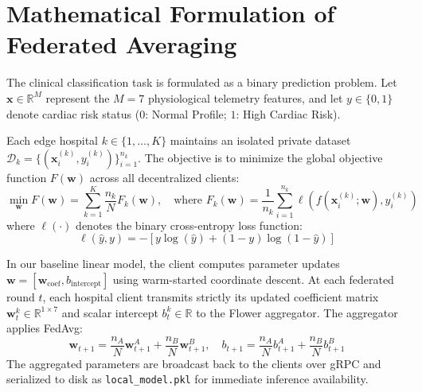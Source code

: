 \documentclass[12pt,a4paper,oneside]{report}
\begin{document}
\section{Mathematical Formulation of Federated Averaging}
The clinical classification task is formulated as a binary prediction problem. Let $\mathbf{x} \in \mathbb{R}^M$ represent the $M=7$ physiological telemetry features, and let $y \in \{0, 1\}$ denote cardiac risk status ($0$: Normal Profile; $1$: High Cardiac Risk).

Each edge hospital $k \in \{1, \dots, K\}$ maintains an isolated private dataset $\mathcal{D}_k = \{(\mathbf{x}_i^{(k)}, y_i^{(k)})\}_{i=1}^{n_k}$. The objective is to minimize the global objective function $F(\mathbf{w})$ across all decentralized clients:
\begin{equation}
    \min_{\mathbf{w}} F(\mathbf{w}) = \sum_{k=1}^{K} \frac{n_k}{N} F_k(\mathbf{w}), \quad \text{where } F_k(\mathbf{w}) = \frac{1}{n_k} \sum_{i=1}^{n_k} \ell(f(\mathbf{x}_i^{(k)}; \mathbf{w}), y_i^{(k)})
    \label{eq:fl_loss}
\end{equation}
where $\ell(\cdot)$ denotes the binary cross-entropy loss function:
\begin{equation}
    \ell(\hat{y}, y) = - \left[ y \log(\hat{y}) + (1 - y) \log(1 - \hat{y}) \right]
\end{equation}

In our baseline linear model, the client computes parameter updates $\mathbf{w} = [\mathbf{w}_{\text{coef}}, b_{\text{intercept}}]$ using warm-started coordinate descent. At each federated round $t$, each hospital client transmits strictly its updated coefficient matrix $\mathbf{w}_t^k \in \mathbb{R}^{1 \times 7}$ and scalar intercept $b_t^k \in \mathbb{R}$ to the Flower aggregator. The aggregator applies FedAvg:
\begin{equation}
    \mathbf{w}_{t+1} = \frac{n_A}{N} \mathbf{w}_{t+1}^A + \frac{n_B}{N} \mathbf{w}_{t+1}^B, \quad b_{t+1} = \frac{n_A}{N} b_{t+1}^A + \frac{n_B}{N} b_{t+1}^B
    \label{eq:fedavg_concrete}
\end{equation}
The aggregated parameters are broadcast back to the clients over gRPC and serialized to disk as \texttt{local\_model.pkl} for immediate inference availability.
\end{document}
